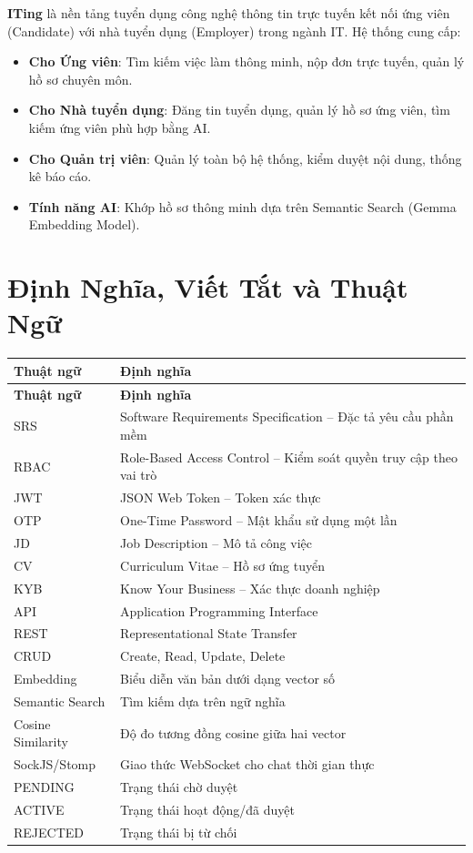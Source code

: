 \documentclass[12pt, a4paper]{report}
\begin{document}
\textbf{ITing} là nền tảng tuyển dụng công nghệ thông tin trực tuyến kết nối ứng viên (Candidate) với nhà tuyển dụng (Employer) trong ngành IT. Hệ thống cung cấp:

\begin{itemize}
    \item \textbf{Cho Ứng viên}: Tìm kiếm việc làm thông minh, nộp đơn trực tuyến, quản lý hồ sơ chuyên môn.
    \item \textbf{Cho Nhà tuyển dụng}: Đăng tin tuyển dụng, quản lý hồ sơ ứng viên, tìm kiếm ứng viên phù hợp bằng AI.
    \item \textbf{Cho Quản trị viên}: Quản lý toàn bộ hệ thống, kiểm duyệt nội dung, thống kê báo cáo.
    \item \textbf{Tính năng AI}: Khớp hồ sơ thông minh dựa trên Semantic Search (Gemma Embedding Model).
\end{itemize}

\section{Định Nghĩa, Viết Tắt và Thuật Ngữ}

\begin{longtable}{|p{4cm}|p{10cm}|}
\hline
\textbf{Thuật ngữ} & \textbf{Định nghĩa} \\
\hline
\endfirsthead
\hline
\textbf{Thuật ngữ} & \textbf{Định nghĩa} \\
\hline
\endhead
SRS & Software Requirements Specification -- Đặc tả yêu cầu phần mềm \\
\hline
RBAC & Role-Based Access Control -- Kiểm soát quyền truy cập theo vai trò \\
\hline
JWT & JSON Web Token -- Token xác thực \\
\hline
OTP & One-Time Password -- Mật khẩu sử dụng một lần \\
\hline
JD & Job Description -- Mô tả công việc \\
\hline
CV & Curriculum Vitae -- Hồ sơ ứng tuyển \\
\hline
KYB & Know Your Business -- Xác thực doanh nghiệp \\
\hline
API & Application Programming Interface \\
\hline
REST & Representational State Transfer \\
\hline
CRUD & Create, Read, Update, Delete \\
\hline
Embedding & Biểu diễn văn bản dưới dạng vector số \\
\hline
Semantic Search & Tìm kiếm dựa trên ngữ nghĩa \\
\hline
Cosine Similarity & Độ đo tương đồng cosine giữa hai vector \\
\hline
SockJS/Stomp & Giao thức WebSocket cho chat thời gian thực \\
\hline
PENDING & Trạng thái chờ duyệt \\
\hline
ACTIVE & Trạng thái hoạt động/đã duyệt \\
\hline
REJECTED & Trạng thái bị từ chối \\
\hline
\end{longtable}
\end{document}
